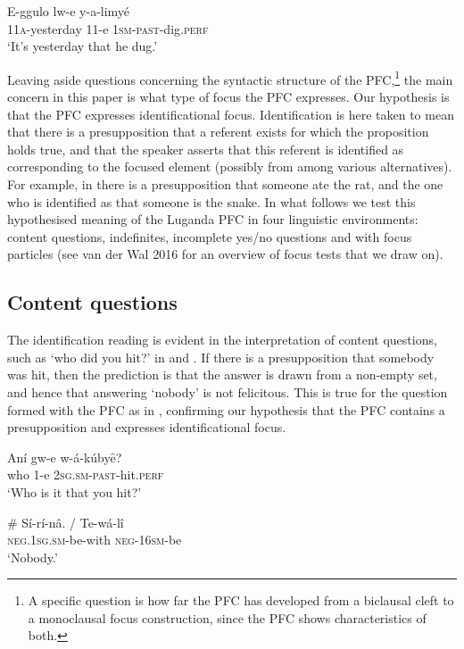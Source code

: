 \documentclass[output=paper]{langsci/langscibook}
\begin{document}
\ea
\gll E-ggulo    lw-e  y-a-limyé\\
     11\textsc{a}-yesterday  11-e  \textsc{1sm}-\textsc{past}-dig.\textsc{perf}\\
\glt ‘It’s yesterday that he dug.’
\z

Leaving aside questions concerning the syntactic structure of the PFC,\footnote{A specific question is how far the PFC has developed from a biclausal cleft to a monoclausal focus construction, since the PFC shows characteristics of both.}{} the main concern in this paper is what type of focus the PFC expresses. Our hypothesis is that the PFC expresses identificational focus. Identification is here taken to mean that there is a presupposition that a referent exists for which the proposition holds true, and that the speaker asserts that this referent is identified as corresponding to the focused element (possibly from among various alternatives). For example, in  there is a presupposition that someone ate the rat, and the one who is identified as that someone is the snake. In what follows we test this hypothesised meaning of the Luganda PFC in four linguistic environments: content questions, indefinites, incomplete yes/no questions and with focus particles (see van der Wal 2016 for an overview of focus tests that we draw on).

\subsection{Content questions} %

The identification reading is evident in the interpretation of content questions, such as ‘who did you hit?’ in  and . If there is a presupposition that somebody was hit, then the prediction is that the answer is drawn from a non-empty set, and hence that answering ‘nobody’ is not felicitous. This is true for the question formed with the PFC as in , confirming our hypothesis that the PFC contains a presupposition and expresses identificational focus. 

\ea
\gll Aní  gw-e  w-á-kúbyȇ?\\
     who  1-e  \textsc{2sg.sm-past}-hit.\textsc{perf}\\
\glt ‘Who is it that you hit?’
\z

\ea
\gll \# Sí-rí-nâ.    /  Te-wá-lî\\
     \textsc{neg.1sg.sm}-be-with    \textsc{neg-16sm}-be\\
\glt ‘Nobody.’
\z
\end{document}
